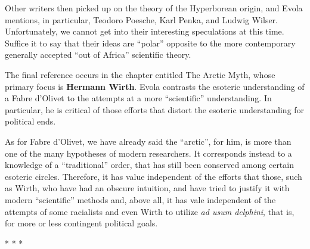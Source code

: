 Other writers then picked up on the theory of the Hyperborean origin, and Evola mentions, in particular, Teodoro Poesche, Karl Penka, and Ludwig Wilser. Unfortunately, we cannot get into their interesting speculations at this time. Suffice it to say that their ideas are ``polar'' opposite to the more contemporary generally accepted ``out of Africa'' scientific theory.

The final reference occurs in the chapter entitled The Arctic Myth, whose primary focus is \textbf{Hermann Wirth}. Evola contrasts the esoteric understanding of a Fabre d'Olivet to the attempts at a more ``scientific'' understanding. In particular, he is critical of those efforts that distort the esoteric understanding for political ends.

\begin{quotex}
As for Fabre d'Olivet, we have already said the ``arctic'', for him, is more than one of the many hypotheses of modern researchers. It corresponds instead to a knowledge of a ``traditional'' order, that has still been conserved among certain esoteric circles. Therefore, it has value independent of the efforts that those, such as Wirth, who have had an obscure intuition, and have tried to justify it with modern ``scientific'' methods and, above all, it has vale independent of the attempts of some racialists and even Wirth to utilize \emph{ad usum delphini}, that is, for more or less contingent political goals.
\end{quotex}




\begin{center}* * *\end{center}

